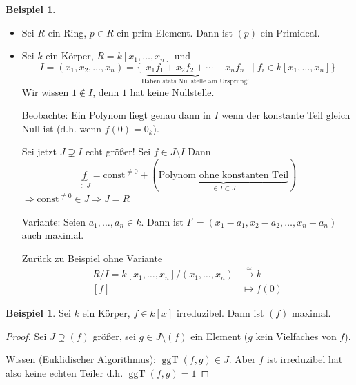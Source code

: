 \documentclass[12pt,parskip=full]{scrartcl}
\theoremstyle{definition}
\newtheorem{example}[theorem]{Beispiel}
\theoremstyle{remark}
\begin{document}
	\begin{example}
		\begin{itemize}
			\item Sei $R$ ein Ring, $p \in R$ ein prim-Element. Dann ist $(p)$ ein Primideal.
			\item Sei $k$ ein Körper, $R = k[x_1, \dots, x_n]$ und
			\begin{equation*}
				I = (x_1, x_2, \dots, x_n)= \{ \underbrace{x_1 f_1 + x_2 f_2 + \cdots + x_n f_n}_\text{Haben stets Nullstelle am Ursprung!} \mid f_i \in k[x_1, \dots, x_n] \}
			\end{equation*}
			Wir wissen $1 \notin I$, denn $1$ hat keine Nullstelle.
			
			Beobachte: Ein Polynom liegt genau dann in $I$ wenn der konstante Teil gleich Null ist (d.h. wenn $f(0) = 0_k$).
			
			Sei jetzt $J \supsetneq I$ echt größer! Sei $f \in J \setminus I$ Dann
			\begin{equation*}
				\underbrace{f}_{\in J} = \text{const}^{\neq 0} + (\underbrace{\text{Polynom ohne konstanten Teil}}_{\in I \subset J})
			\end{equation*}
			$\Rightarrow \text{const}^{\neq 0} \in J \Rightarrow J = R$
			
			Variante: Seien $a_1, \dots, a_n \in k$. Dann ist $I' = (x_1 - a_1, x_2 - a_2, \dots, x_n - a_n)$ auch maximal.
			
			Zurück zu Beispiel ohne Variante
			\begin{align*}
				R/I = k[x_1, \dots, x_n]/(x_1, \dots, x_n) &\overset{\simeq}{\longrightarrow} k \\
				[f] &\longmapsto f(0)
			\end{align*}
		\end{itemize}
	\end{example}

	\begin{example}
		Sei $k$ ein Körper, $f \in k[x]$ irreduzibel. Dann ist $(f)$ maximal.
	\end{example}

	\begin{proof}
		Sei $J \supsetneq (f)$ größer, sei $g \in J \setminus (f)$ ein Element ($g$ kein Vielfaches von $f$).
		
		Wissen (Euklidischer Algorithmus): $\operatorname{ggT}(f,g) \in J$. Aber $f$ ist irreduzibel hat also keine echten Teiler d.h. $\operatorname{ggT}(f,g) = 1$
	\end{proof}
\end{document}

